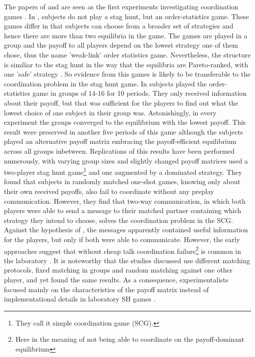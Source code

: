 The papers of \textcite{van_huyck_tacit_1990} and 
\textcite{cooper_communication_1992} are seen as the first experiments 
investigating coordination games \parencite{devetag_when_2007}.
In \textcite{van_huyck_tacit_1990}, subjects do not play a stag
hunt, but an order-statistics game. These games differ in that subjects can
choose from a broader set of strategies and hence there are more than two 
equilibria in the game. The games are played in a group and the payoff to 
all players depend on the lowest strategy one of them chose, thus the name 
'weak-link' order statistics game. Nevertheless, the structure is similiar to
the stag hunt in the way that the equilibria are Pareto-ranked, with one 
'safe' strategy \parencite{devetag_when_2007}.
So evidence from this games is 
likely to be transferable to the coordination problem in the stag hunt game. 
In \textcite{van_huyck_tacit_1990} subjects played the order-statistics 
game in 
groups of 14-16 for 10 periods. They only received information about their 
payoff, but that was sufficient for the players to find out what the 
lowest choice of one subject in 
their group was. Astonishingly, in every experiment the groups converged
to the equilibrium with the lowest payoff. 
This result were preserved in another 
five periods of this game although the subjects played an alternative payoff
matrix embracing the payoff-efficient equilibrium across all groups 
inbetween. 
Replications of this results have been performed numerously, with 
varying group sizes and slightly changed payoff matrices 
\parencite[6]{devetag_when_2007} 
\textcite{cooper_communication_1992} used a
two-player stag hunt game\footnote{They call 
it simple coordination game (SCG).}  
and one augmented by a dominated strategy. They found that 
subjects in randomly matched one-shot games, knowing only about their own
received payoffs, also fail to coordinate without any preplay communication. 
However, they find that two-way communication, in which both players were
able to send a message to their matched partner containing which strategy
they intend to choose, solves the coordination problem in the SCG. 
Against the hypothesis of \textcite{aumann_nash_1990}, the messages
apparently contained useful information for the players, but only if both
were able to communicate.
However, the 
early approaches suggest that without cheap talk 
coordination failure\footnote{Here in the meaning of not being 
able to coordinate on the payoff-dominant equilibrium} 
is common in the laboratory \parencite[2]{devetag_when_2007}. 
It is noteworthy that the studies 
discussed use different matching protocols, fixed matching in groups and 
random matching against one other player, and yet found the same results. 
As a consequence, experimentalists focused mainly on the characteristics 
of the payoff matrix instead of implementational details in laboratory SH 
games \parencite[8]{devetag_when_2007}.

